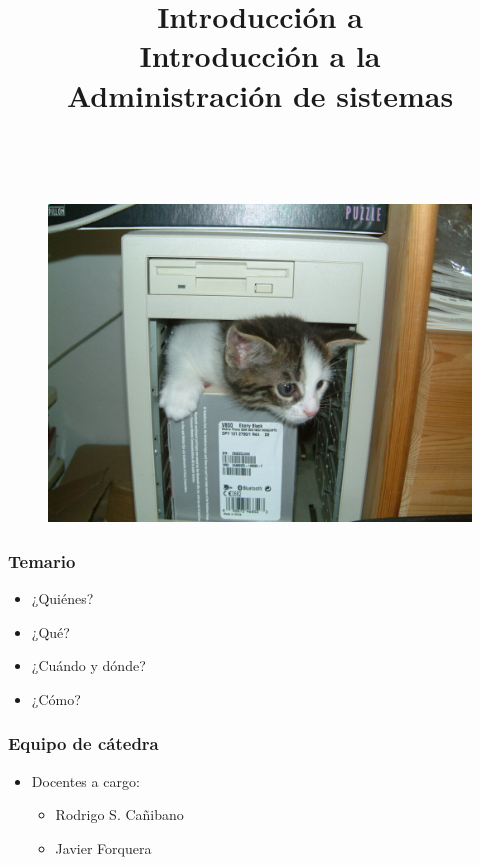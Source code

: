 \documentclass[11pt,a4paper,spanish]{beamer}
\title{Introducción a\\
\textbf{Introducción a la\\
Administración de sistemas}}
\author{}
\date{}
\begin{document}
\begin{frame}[noframenumbering]

    \maketitle
    \centering
    \vspace{-8em}~
    \begin{figure}
    \includegraphics[height=0.55\textheight]{img/ckitten.jpg}
        \captionsetup{textfont=tiny,labelformat=empty}
        \caption{\ccbysa\cite{ckitten}}
    \end{figure}

\end{frame}

\begin{frame}

    \frametitle{Temario}

\begin{itemize}

\item ¿Quiénes?

\item ¿Qué?

\item ¿Cuándo y dónde?

\item ¿Cómo?

\end{itemize}

\end{frame}

\begin{frame}

    \frametitle{Equipo de cátedra}

\begin{itemize}

\item Docentes a cargo:
    \begin{itemize}
        \item Rodrigo S. Cañibano
        \item Javier Forquera
    \end{itemize}
\end{itemize}

\end{frame}
\end{document}
